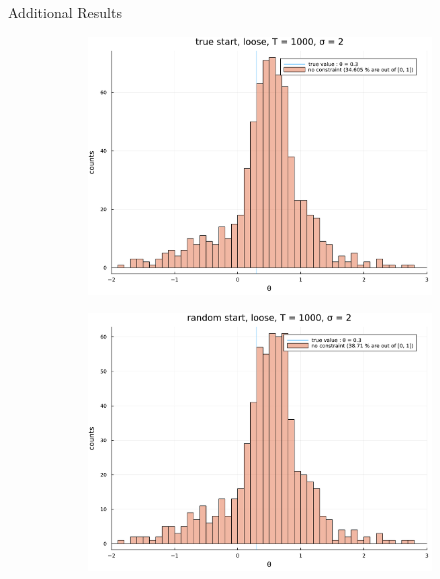 \documentclass[aspectratio = 169]{beamer}
\theoremstyle{definition}
\begin{document}
\begin{frame}{Additional Results}
\begin{figure}
    \begin{subfigure}[b]{0.475\textwidth}
         \centering
         \includegraphics[width=\textwidth]{figuretable/loose/histogram_loglinear_loglinear_n_1000_sigma_2_non_constraint_true_start.pdf}
     \end{subfigure}
        \hfill
        \begin{subfigure}[b]{0.475\textwidth}
             \centering
             \includegraphics[width=\textwidth]{figuretable/loose/histogram_loglinear_loglinear_n_1000_sigma_2_non_constraint_random_start.pdf}
        \end{subfigure}
\end{figure}
\end{frame}
\end{document}
